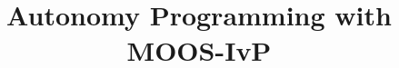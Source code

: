 \documentclass[letterpaper,10pt,twocolumn]{book}
\begin{document}
\frontmatter

\begin{titlepage}
\title{Autonomy Programming with MOOS-IvP}
\author{}
\date{}

\maketitle
\end{titlepage}

\tableofcontents

\mainmatter






\appendix






\backmatter

\end{document}

